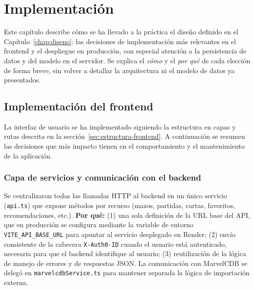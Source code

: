 
\chapter{Implementación}
\label{chap:implementacion}

Este capítulo describe cómo se ha llevado a la práctica el diseño definido en el Capítulo~\ref{chap:diseno}: las decisiones de implementación más relevantes en el frontend y el despliegue en producción, con especial atención a la persistencia de datos y del modelo en el servidor. Se explica el \textit{cómo} y el \textit{por qué} de cada elección de forma breve, sin volver a detallar la arquitectura ni el modelo de datos ya presentados.

\section{Implementación del frontend}

La interfaz de usuario se ha implementado siguiendo la estructura en capas y rutas descrita en la sección~\ref{sec:estructura-frontend}. A continuación se resumen las decisiones que más impacto tienen en el comportamiento y el mantenimiento de la aplicación.

\subsection{Capa de servicios y comunicación con el backend}

Se centralizaron todas las llamadas HTTP al backend en un único servicio (\texttt{api.ts}) que expone métodos por recurso (mazos, partidas, cartas, favoritos, recomendaciones, etc.). \textbf{Por qué:} (1) una sola definición de la URL base del API, que en producción se configura mediante la variable de entorno \texttt{VITE\_API\_BASE\_URL} para apuntar al servicio desplegado en Render; (2) envío consistente de la cabecera \texttt{X-Auth0-ID} cuando el usuario está autenticado, necesaria para que el backend identifique al usuario; (3) reutilización de la lógica de manejo de errores y de respuestas JSON. La comunicación con MarvelCDB se delegó en \texttt{marvelcdbService.ts} para mantener separada la lógica de importación externa.

